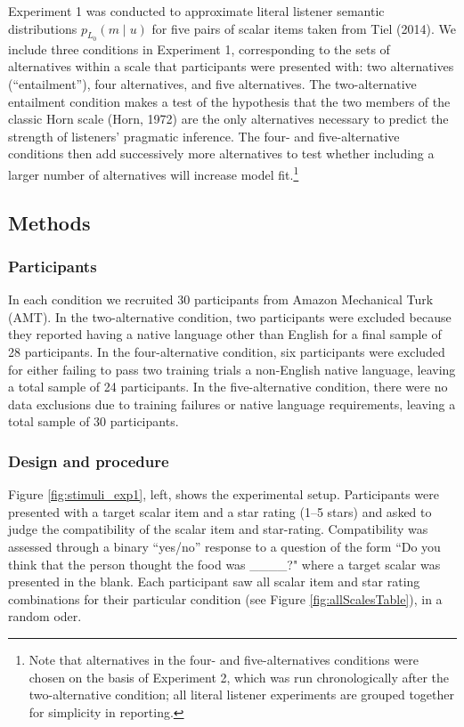 \documentclass[10pt, letterpaper]{article}
\begin{document}
Experiment 1 was conducted to approximate literal listener semantic
distributions \(p_{L_0}(m \mid u)\) for five pairs of scalar items taken
from Tiel (2014). We include three conditions in Experiment 1,
corresponding to the sets of alternatives within a scale that
participants were presented with: two alternatives (``entailment''),
four alternatives, and five alternatives. The two-alternative entailment
condition makes a test of the hypothesis that the two members of the
classic Horn scale (Horn, 1972) are the only alternatives necessary to
predict the strength of listeners' pragmatic inference. The four- and
five-alternative conditions then add successively more alternatives to
test whether including a larger number of alternatives will increase
model
fit.\footnote{Note that alternatives in the four- and five-alternatives conditions were chosen on the basis of Experiment 2, which was run chronologically after the two-alternative condition; all literal listener experiments are grouped together for simplicity in reporting.}

\subsection{Methods}\label{methods}

\subsubsection{Participants}\label{participants}

In each condition we recruited 30 participants from Amazon Mechanical
Turk (AMT). In the two-alternative condition, two participants were
excluded because they reported having a native language other than
English for a final sample of 28 participants. In the four-alternative
condition, six participants were excluded for either failing to pass two
training trials a non-English native language, leaving a total sample of
24 participants. In the five-alternative condition, there were no data
exclusions due to training failures or native language requirements,
leaving a total sample of 30 participants.

\subsubsection{Design and procedure}\label{design-and-procedure}

Figure \ref{fig:stimuli_exp1}, left, shows the experimental setup.
Participants were presented with a target scalar item and a star rating
(1--5 stars) and asked to judge the compatibility of the scalar item and
star-rating. Compatibility was assessed through a binary ``yes/no''
response to a question of the form ``Do you think that the person
thought the food was \_\_\_\_?" where a target scalar was presented in
the blank. Each participant saw all scalar item and star rating
combinations for their particular condition (see Figure
\ref{fig:allScalesTable}), in a random oder.
\end{document}
